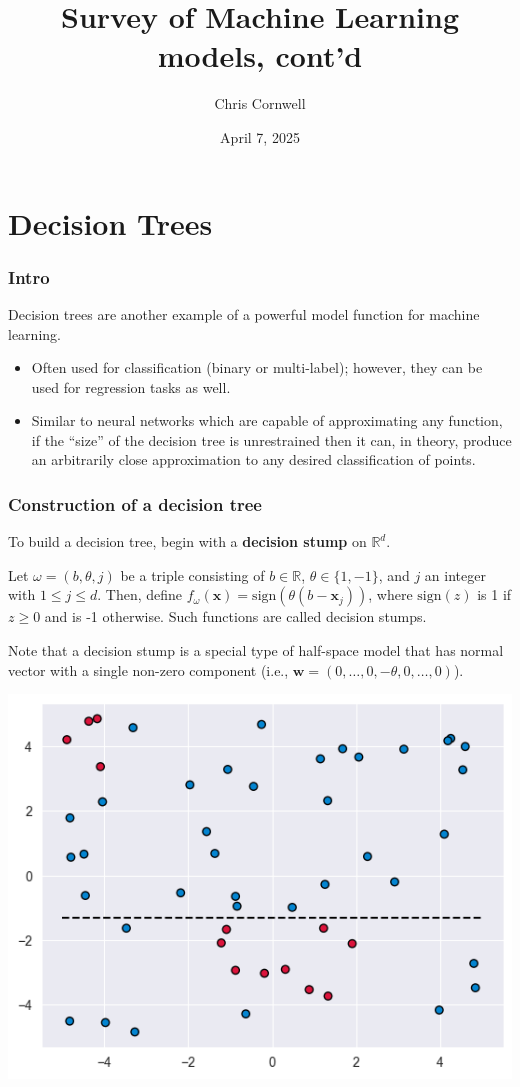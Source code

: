 \documentclass[smaller]{beamer}
\author{Chris Cornwell}
\date{April 7, 2025}
\title{Survey of Machine Learning models, cont'd}
\theoremstyle{example}
\newcommand{\x}{\textbf{x}}
\begin{document}
\begin{frame}
\titlepage
\end{frame}

\section{Decision Trees}

\begin{frame}
\frametitle{Intro}
Decision trees are another example of a powerful model function for machine learning. 
\begin{itemize}
    \item Often used for classification (binary or multi-label); however, they can be used for regression tasks as well. 
    \item Similar to neural networks which are capable of approximating any function, if the ``size'' of the decision tree is unrestrained then it can, in theory, produce an arbitrarily close approximation to any desired classification of points.
\end{itemize}

\end{frame}

\begin{frame}
    \frametitle{Construction of a decision tree}
To build a decision tree, begin with a \textbf{decision stump} on $\mathbb R^d$. 

Let $\omega = (b, \theta, j)$ be a triple consisting of $b\in\mathbb R$, $\theta\in\{1,-1\}$, and $j$ an integer with $1\le j\le d$. Then, define $f_{\omega}(\x) = \textrm{sign}(\theta(b - \x_j))$, where $\textrm{sign}(z)$ is 1 if $z\ge 0$ and is -1 otherwise. Such functions are called decision stumps.

Note that a decision stump is a special type of half-space model that has normal vector with a single non-zero component (i.e., $\textbf{w} = (0,\ldots,0,-\theta,0,\ldots,0)$). 

\centering
\includegraphics[height=0.3\textheight]{../../Images/decision_stump.png}
\end{frame}
\end{document}

